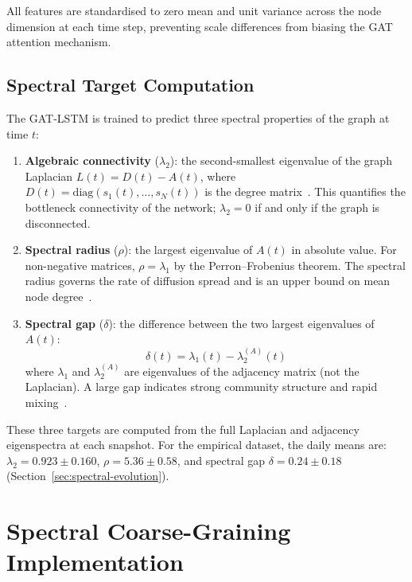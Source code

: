 All features are standardised to zero mean and unit variance across the node dimension at each time step, preventing scale differences from biasing the GAT attention mechanism.

\subsection{Spectral Target Computation}

The GAT-LSTM is trained to predict three spectral properties of the graph at time $t$:

\begin{enumerate}
    \item \textbf{Algebraic connectivity} ($\lambda_2$): the second-smallest eigenvalue of the graph Laplacian $L(t) = D(t) - A(t)$, where $D(t) = \mathrm{diag}(s_1(t), \ldots, s_N(t))$ is the degree matrix~\cite{fiedler1973algebraic}. This quantifies the bottleneck connectivity of the network; $\lambda_2 = 0$ if and only if the graph is disconnected.

    \item \textbf{Spectral radius} ($\rho$): the largest eigenvalue of $A(t)$ in absolute value. For non-negative matrices, $\rho = \lambda_1$ by the Perron--Frobenius theorem. The spectral radius governs the rate of diffusion spread and is an upper bound on mean node degree~\cite{cvetkovic1995spectra}.

    \item \textbf{Spectral gap} ($\delta$): the difference between the two largest eigenvalues of $A(t)$:
    \begin{equation}
        \delta(t) = \lambda_1(t) - \lambda_2^{(A)}(t)
        \label{eq:gap}
    \end{equation}
    where $\lambda_1$ and $\lambda_2^{(A)}$ are eigenvalues of the adjacency matrix (not the Laplacian). A large gap indicates strong community structure and rapid mixing~\cite{chung1997spectral}.
\end{enumerate}

These three targets are computed from the full Laplacian and adjacency eigenspectra at each snapshot. For the empirical dataset, the daily means are: $\lambda_2 = 0.923 \pm 0.160$, $\rho = 5.36 \pm 0.58$, and spectral gap $\delta = 0.24 \pm 0.18$ (Section~\ref{sec:spectral-evolution}).


\section{Spectral Coarse-Graining Implementation}
\label{sec:scg-method}

